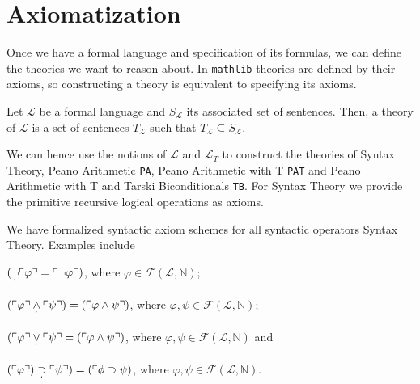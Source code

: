 \chapter{Axiomatization}\label{chapter:axiomatization}
Once we have a formal language and specification of its formulas, we can define the theories we want to reason about. In \texttt{mathlib} theories are defined by their axioms, so constructing a theory is equivalent to specifying its axioms. 

\begin{definition}[Theory]\label{def:FO-Theory}
  \leanok
  Let $\mathcal{L}$ be a formal language and $S_{\mathcal{L}}$ its associated set of sentences. Then, a theory of $\mathcal{L}$ is a set of sentences $T_{\mathcal{L}}$ such that $T_{\mathcal{L}} \subseteq S_{\mathcal{L}}$.
\end{definition}

We can hence use the notions of $\mathcal{L}$ and $\mathcal{L}_T$ to construct the theories of Syntax Theory, Peano Arithmetic \texttt{PA}, Peano Arithmetic with T \texttt{PAT} and Peano Arithmetic with T and Tarski Biconditionals \texttt{TB}. For Syntax Theory we provide the primitive recursive logical operations as axioms.

\begin{definition}\label{def:Syntax-Axioms}
\leanok
{}
We have formalized syntactic axiom schemes for all syntactic operators Syntax Theory. Examples include 

$(\underset{^{\boldsymbol{\cdot}}}{\neg} \ulcorner \varphi \urcorner = \ulcorner \neg \varphi \urcorner)$, where $\varphi \in \mathcal{F}(\mathcal{L},\mathbb{N})$;

$(\ulcorner \varphi \urcorner \underset{^{\boldsymbol{\cdot}}}{\wedge} \ulcorner \psi \urcorner) = (\ulcorner \varphi \wedge \psi \urcorner)$, where $\varphi, \psi \in \mathcal{F}(\mathcal{L},\mathbb{N})$;

$(\ulcorner \varphi \urcorner \underset{^{\boldsymbol{\cdot}}}{\vee} \ulcorner \psi \urcorner = (\ulcorner \varphi \wedge \psi \urcorner)$, where $\varphi, \psi \in \mathcal{F}(\mathcal{L},\mathbb{N})$ and

$(\ulcorner \varphi \urcorner) \underset{^{\boldsymbol{\cdot}}}{\supset} \ulcorner \psi \urcorner) = (\ulcorner \phi \supset \psi)$, where $\varphi, \psi \in \mathcal{F}(\mathcal{L},\mathbb{N})$.
\end{definition}

